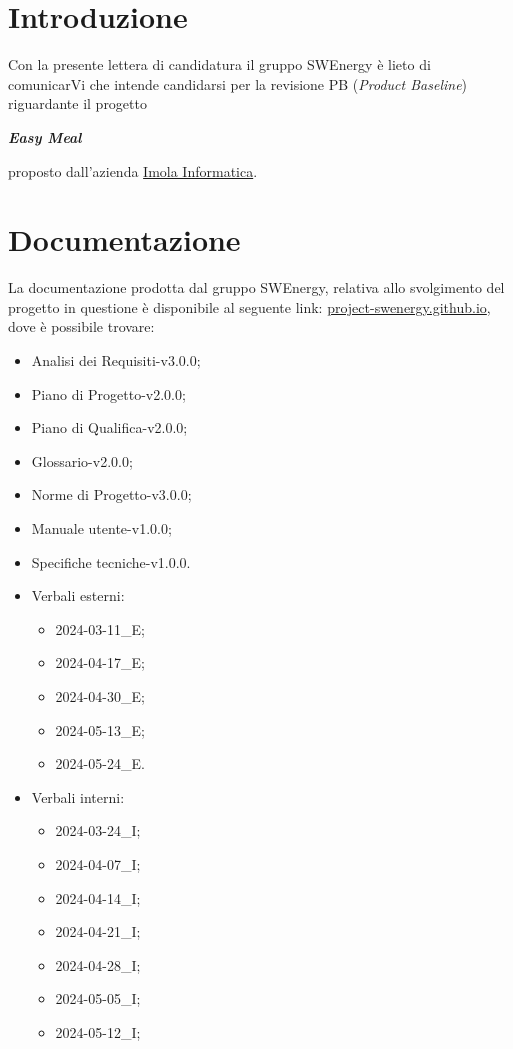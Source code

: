 \section{Introduzione}

Con la presente lettera di candidatura il gruppo SWEnergy è lieto di comunicarVi
che intende candidarsi per la revisione PB (\textit{Product Baseline}) riguardante il progetto

\begin{center}
	\textbf{\textit{Easy Meal}}
\end{center}

\noindent
proposto dall'azienda \href{https://imolainformatica.it/}{Imola Informatica}.

\section{Documentazione}

La documentazione prodotta dal gruppo SWEnergy, relativa allo svolgimento del
progetto in questione è disponibile al seguente link:
\href{https://project-swenergy.github.io/}{project-swenergy.github.io},
dove è possibile trovare:
\begin{itemize}
	\item Analisi dei Requisiti-v3.0.0;
	\item Piano di Progetto-v2.0.0;
	\item Piano di Qualifica-v2.0.0;
	\item Glossario-v2.0.0;
	\item Norme di Progetto-v3.0.0;
	\item Manuale utente-v1.0.0;
	\item Specifiche tecniche-v1.0.0.

	\item Verbali esterni:
	      \begin{itemize}
		      \item 2024-03-11\_E;
		      \item 2024-04-17\_E;
		      \item 2024-04-30\_E;
		      \item 2024-05-13\_E;
		      \item 2024-05-24\_E.
	      \end{itemize}

	\item Verbali interni:
	      \begin{itemize}
			\item 2024-03-24\_I;
			\item 2024-04-07\_I;
			\item 2024-04-14\_I;
			\item 2024-04-21\_I;
			\item 2024-04-28\_I;
			\item 2024-05-05\_I;
			\item 2024-05-12\_I; 
	      \end{itemize}
\end{itemize}

